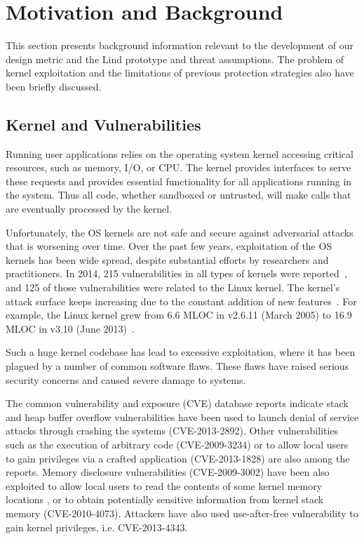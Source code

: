 \section{Motivation and Background}
\label{sec.motivation-and-background}

This section presents background information 
relevant to the development of our design metric and the Lind prototype and threat assumptions. The problem of kernel exploitation and the limitations of previous protection strategies also have been briefly discussed. 

\subsection{Kernel and Vulnerabilities}

Running user applications relies on the operating system kernel 
accessing critical resources, such as memory, I/O, or CPU. 
The kernel provides interfaces to serve these requests 
and provides essential functionality for all applications running in the
system. 
Thus all code, whether sandboxed or untrusted, will make calls 
that are eventually processed by the kernel. 

Unfortunately, the OS kernels are not safe and secure against adversarial attacks that is worsening over time. Over the past few years, exploitation of the OS kernels has been wide
spread, despite substantial efforts by researchers and practitioners. 
In 2014, 215 vulnerabilities in all types of kernels were reported~\cite{NVD}, 
and 125 of those vulnerabilities were related to the Linux kernel. 
The kernel's
attack surface keeps increasing due to the constant addition of new
features~\cite{Metrics-13}. For example, the Linux kernel grew from 6.6 MLOC in v2.6.11 (March 2005) to 16.9 MLOC in v3.10 (June 2013)~\cite{Linux-13}. 


Such a huge kernel codebase has lead to excessive exploitation, where it has been plagued by a number of common
software flaws. 
These flaws have raised serious security concerns and caused severe damage
to systems. 

The common vulnerability and exposure (CVE) database reports indicate stack and heap buffer overflow vulnerabilities have been used to launch denial of service attacks through crashing the systems (CVE-2013-2892).
Other vulnerabilities such as the execution of arbitrary code (CVE-2009-3234) 
or to allow local users to gain privileges via a crafted 
application (CVE-2013-1828) are also among the reports.
Memory disclosure vulnerabilities (CVE-2009-3002) have been also exploited to allow local users
to read 
the contents of some kernel memory locations
, or to obtain potentially sensitive information from kernel stack memory (CVE-2010-4073).
Attackers have also used use-after-free vulnerability to gain kernel
privileges, i.e. CVE-2013-4343.

